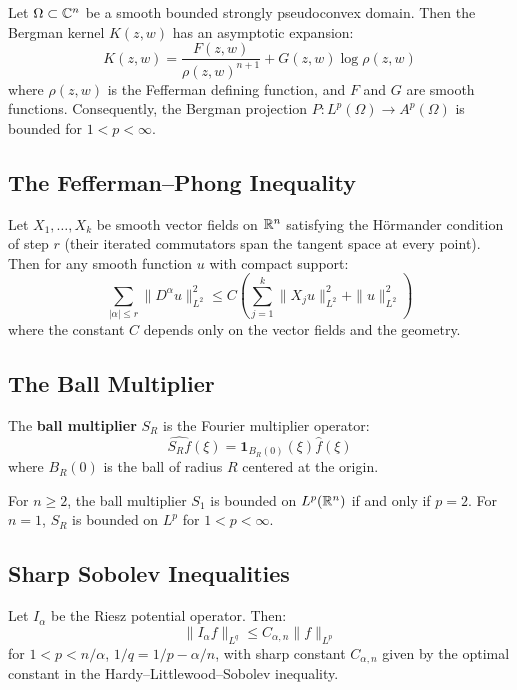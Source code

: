\begin{theorem}[C.\ Fefferman, 1974]
Let $\Omega \subset \mathbb{C}^n$ be a smooth bounded strongly pseudoconvex domain. Then the Bergman kernel $K(z,w)$ has an asymptotic expansion:
\[
K(z,w) = \frac{F(z,w)}{\rho(z,w)^{n+1}} + G(z,w) \log \rho(z,w)
\]
where $\rho(z,w)$ is the Fefferman defining function, and $F$ and $G$ are smooth functions. Consequently, the Bergman projection $P: L^p(\Omega) \to A^p(\Omega)$ is bounded for $1 < p < \infty$.
\end{theorem}

\subsection{The Fefferman--Phong Inequality}

\begin{theorem}
Let $X_1, \ldots, X_k$ be smooth vector fields on $\mathbb{R}^n$ satisfying the H\"ormander condition of step $r$ (their iterated commutators span the tangent space at every point). Then for any smooth function $u$ with compact support:
\[
\sum_{|\alpha| \leq r} \|D^\alpha u\|_{L^2}^2 \leq C \left( \sum_{j=1}^k \|X_j u\|_{L^2}^2 + \|u\|_{L^2}^2 \right)
\]
where the constant $C$ depends only on the vector fields and the geometry.
\end{theorem}

\subsection{The Ball Multiplier}

\begin{definition}
The \textbf{ball multiplier} $S_R$ is the Fourier multiplier operator:
\[
\widehat{S_R f}(\xi) = \mathbf{1}_{B_R(0)}(\xi) \hat f(\xi)
\]
where $B_R(0)$ is the ball of radius $R$ centered at the origin.
\end{definition}

\begin{theorem}[C.\ Fefferman, 1971]
For $n \geq 2$, the ball multiplier $S_1$ is bounded on $L^p(\mathbb{R}^n)$ if and only if $p = 2$. For $n = 1$, $S_R$ is bounded on $L^p$ for $1 < p < \infty$.
\end{theorem}

\subsection{Sharp Sobolev Inequalities}

\begin{theorem}
Let $I_\alpha$ be the Riesz potential operator. Then:
\[
\|I_\alpha f\|_{L^q} \leq C_{\alpha, n} \|f\|_{L^p}
\]
for $1 < p < n/\alpha$, $1/q = 1/p - \alpha/n$, with sharp constant $C_{\alpha,n}$ given by the optimal constant in the Hardy--Littlewood--Sobolev inequality.
\end{theorem}

